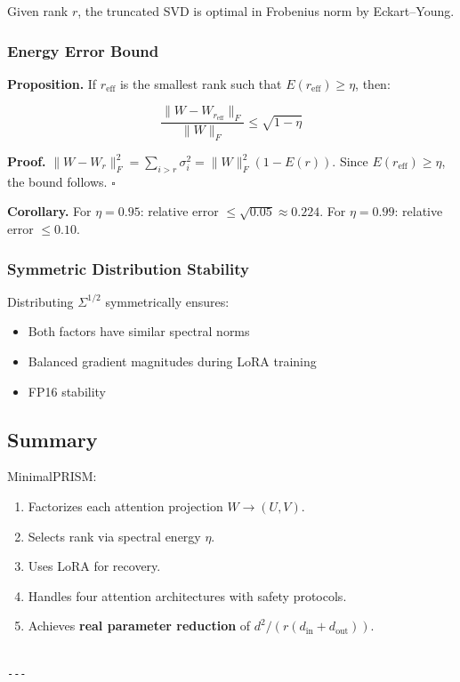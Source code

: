 Given rank $r$, the truncated SVD is optimal in Frobenius norm by 
Eckart--Young.

\subsubsection{Energy Error Bound}

\textbf{Proposition.} If $r_\text{eff}$ is the smallest rank such that 
$E(r_\text{eff}) \geq \eta$, then:

\[
\frac{\|W - W_{r_\text{eff}}\|_F}{\|W\|_F} \leq \sqrt{1 - \eta}
\tag{4.9}
\]

\textbf{Proof.} $\|W - W_r\|_F^2 = \sum_{i > r} \sigma_i^2 = \|W\|_F^2 (1 - E(r))$. 
Since $E(r_\text{eff}) \geq \eta$, the bound follows. $\square$

\textbf{Corollary.} For $\eta = 0.95$: relative error $\leq \sqrt{0.05} \approx 0.224$. 
For $\eta = 0.99$: relative error $\leq 0.10$.

\subsubsection{Symmetric Distribution Stability}

Distributing $\Sigma^{1/2}$ symmetrically ensures:
\begin{itemize}
\item Both factors have similar spectral norms
\item Balanced gradient magnitudes during LoRA training
\item FP16 stability

\end{itemize}
\subsection{Summary}

MinimalPRISM:
\begin{enumerate}
\item Factorizes each attention projection $W \to (U, V)$.
\item Selects rank via spectral energy $\eta$.
\item Uses LoRA for recovery.
\item Handles four attention architectures with safety protocols.
\item Achieves \textbf{real parameter reduction} of $d^2 / (r(d_\text{in} + d_\text{out}))$.
\end{enumerate}
\begin{lstlisting}

---
\end{lstlisting}